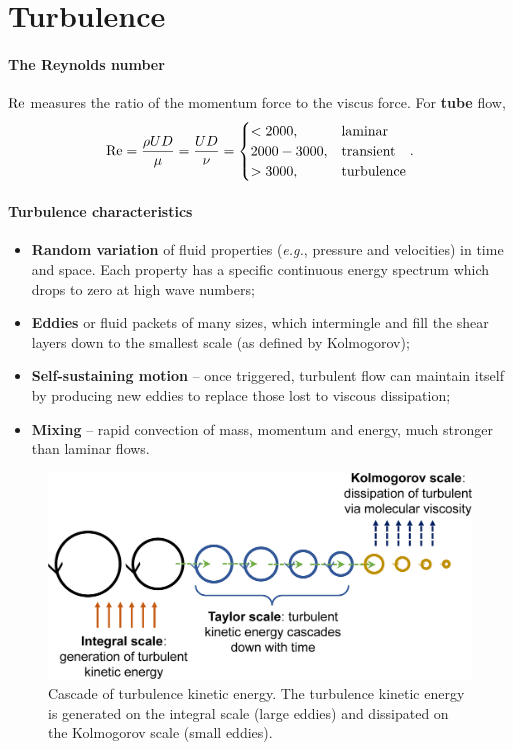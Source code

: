 \documentclass[a4paper]{article}
\begin{document}
\section{Turbulence}
\paragraph{The Reynolds number} $\rm Re$ measures the ratio of the momentum force to the viscus force. For \textbf{tube} flow,
\[ 
    {\rm Re} = \frac{\rho UD}{\mu} = \frac{UD}{\nu}
    = \begin{cases}
        < 2000, & \text{laminar} \\
        2000 - 3000, & \text{transient} \\
        > 3000, & \text{turbulence}
    \end{cases}.
\]

\paragraph{Turbulence characteristics}
\begin{itemize}
    \item \textbf{Random variation} of fluid properties (\textit{e.g.}, pressure and velocities) in time and space. Each property has a specific continuous energy spectrum which drops to zero at high wave numbers;
    
    \item \textbf{Eddies} or fluid packets of many sizes, which intermingle and fill the shear layers down to the smallest scale (as defined by Kolmogorov);
    
    \item \textbf{Self-sustaining motion} – once triggered, turbulent flow can maintain itself by producing new eddies to replace those lost to viscous dissipation;
    
    \item \textbf{Mixing} – rapid convection of mass, momentum and energy, much stronger than laminar flows. 
\end{itemize}

\begin{figure}[H]
    \centering
    \includegraphics[width=.6\textwidth]{img/eddies.eps}
    \caption{Cascade of turbulence kinetic energy. The turbulence kinetic energy is generated on the integral scale (large eddies) and dissipated on the Kolmogorov scale (small eddies).}
\end{figure}
\end{document}
